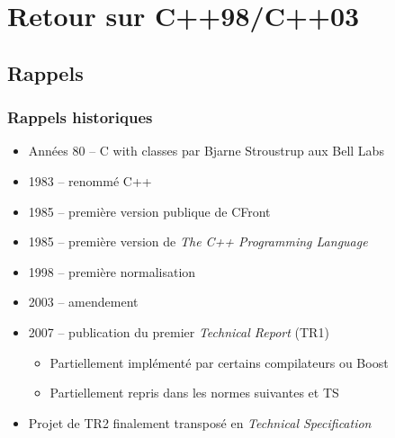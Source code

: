 \documentclass[C++.tex]{subfiles}
\begin{document}
\section{Retour sur C++98/C++03}
\subsection*{Rappels}
\begin{frame}[fragile]
	\frametitle{Rappels historiques}
	\begin{itemize}
		\item Années 80 -- \og C with classes\fg{} par Bjarne Stroustrup aux Bell Labs
		\item 1983 -- renommé C++
		\item 1985 -- première version publique de CFront
		\item 1985 -- première version de \textit{The C++ Programming Language}
		\item 1998 -- première normalisation
		\item 2003 -- amendement
		\item 2007 -- publication du premier \textit{Technical Report} (TR1)


		\begin{itemize}
			\item Partiellement implémenté par certains compilateurs ou Boost
			\item Partiellement repris dans les normes suivantes et TS


		\end{itemize}
		\item Projet de TR2 finalement transposé en \textit{Technical Specification}
	\end{itemize}
\end{frame}
\end{document}
